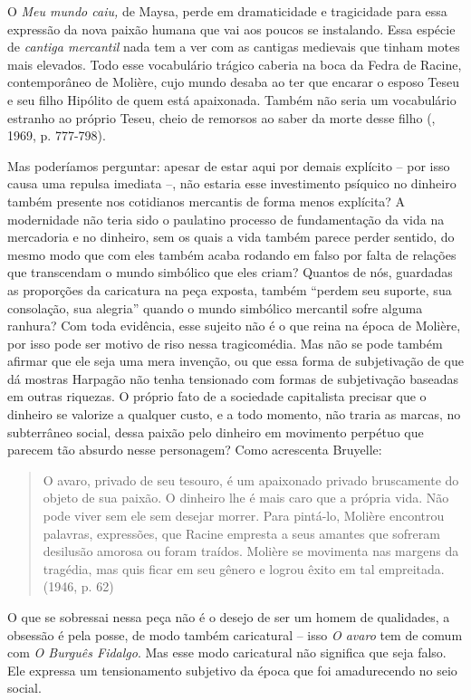 O \emph{Meu mundo caiu,} de Maysa, perde em dramaticidade e tragicidade
para essa expressão da nova paixão humana que vai aos poucos se
instalando. Essa espécie de \emph{cantiga mercantil} nada tem a ver com
as cantigas medievais que tinham motes mais elevados. Todo esse
vocabulário trágico caberia na boca da Fedra de Racine, contemporâneo de
Molière, cujo mundo desaba ao ter que encarar o esposo Teseu e seu filho
Hipólito de quem está apaixonada. Também não seria um vocabulário
estranho ao próprio Teseu, cheio de remorsos ao saber da morte desse
filho (, 1969, p. 777-798).

Mas poderíamos perguntar: apesar de estar aqui por demais explícito --
por isso causa uma repulsa imediata --, não estaria esse investimento
psíquico no dinheiro também presente nos cotidianos mercantis de forma
menos explícita? A modernidade não teria sido o paulatino processo de
fundamentação da vida na mercadoria e no dinheiro, sem os quais a vida
também parece perder sentido, do mesmo modo que com eles também acaba
rodando em falso por falta de relações que transcendam o mundo simbólico
que eles criam? Quantos de nós, guardadas as proporções da caricatura na
peça exposta, também ``perdem seu suporte, sua consolação, sua alegria''
quando o mundo simbólico mercantil sofre alguma ranhura? Com toda
evidência, esse sujeito não é o que reina na época de Molière, por isso
pode ser motivo de riso nessa tragicomédia. Mas não se pode também
afirmar que ele seja uma mera invenção, ou que essa forma de
subjetivação de que dá mostras Harpagão não tenha tensionado com formas
de subjetivação baseadas em outras riquezas. O próprio fato de a
sociedade capitalista precisar que o dinheiro se valorize a qualquer
custo, e a todo momento, não traria as marcas, no subterrâneo social,
dessa paixão pelo dinheiro em movimento perpétuo que parecem tão absurdo
nesse personagem? Como acrescenta Bruyelle:

\begin{quote}
O avaro, privado de seu tesouro, é um apaixonado privado bruscamente do
objeto de sua paixão. O dinheiro lhe é mais caro que a própria vida. Não
pode viver sem ele sem desejar morrer. Para pintá-lo, Molière encontrou
palavras, expressões, que Racine empresta a seus amantes que sofreram
desilusão amorosa ou foram traídos. Molière se movimenta nas margens da
tragédia, mas quis ficar em seu gênero e logrou êxito em tal empreitada.
(1946, p. 62)
\end{quote}

O que se sobressai nessa peça não é o desejo de ser um homem de
qualidades, a obsessão é pela posse, de modo também caricatural -- isso
\emph{O avaro} tem de comum com \emph{O Burguês Fidalgo}. Mas esse modo
caricatural não significa que seja falso. Ele expressa um tensionamento
subjetivo da época que foi amadurecendo no seio social.

